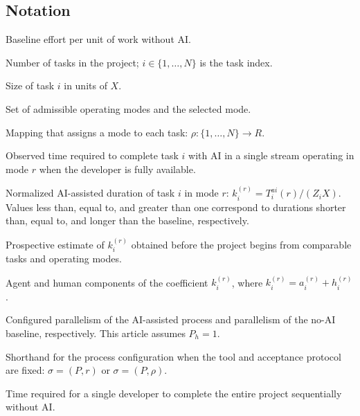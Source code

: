 \subsection{Notation}

\begin{description}[style=nextline]
  \item[$X$] Baseline effort per unit of work without AI.

  \item[$N$] Number of tasks in the project; $i\in\{1,\dots,N\}$ is the task
  index.

  \item[$Z_i$] Size of task $i$ in units of $X$.

  \item[$R$, $r$] Set of admissible operating modes and the selected mode.

  \item[$\rho$] Mapping that assigns a mode to each task:
  $\rho\colon\{1,\dots,N\}\to R$.

  \item[$T_i^{ai}(r)$] Observed time required to complete task $i$ with AI in a
  single stream operating in mode $r$ when the developer is fully available.

  \item[$k_i^{(r)}$] Normalized AI-assisted duration of task $i$ in mode $r$:
  $k_i^{(r)}=T_i^{ai}(r)/(Z_iX)$. Values less than, equal to, and greater than
  one correspond to durations shorter than, equal to, and longer than the
  baseline, respectively.

  \item[$\hat{k}_i^{(r)}$] Prospective estimate of $k_i^{(r)}$ obtained before
  the project begins from comparable tasks and operating modes.

  \item[$a_i^{(r)}$, $h_i^{(r)}$] Agent and human components of the coefficient
  $k_i^{(r)}$, where $k_i^{(r)}=a_i^{(r)}+h_i^{(r)}$.

  \item[$P$, $P_h$] Configured parallelism of the AI-assisted process and
  parallelism of the no-AI baseline, respectively. This article assumes
  $P_h=1$.

  \item[$\sigma$] Shorthand for the process configuration when the tool and
  acceptance protocol are fixed: $\sigma=(P,r)$ or $\sigma=(P,\rho)$.

  \item[$T_h$] Time required for a single developer to complete the entire
  project sequentially without AI.


\end{description}

